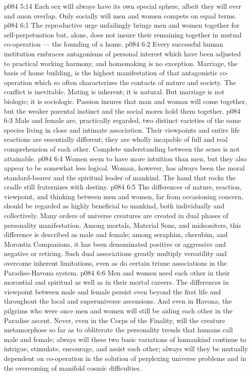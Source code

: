 \vs p084 5:14 Each sex will always have its own special sphere, albeit they will ever and anon overlap. Only socially will men and women compete on equal terms.
\vs p084 6:1 The reproductive urge unfailingly brings men and women together for self\hyp{}perpetuation but, alone, does not insure their remaining together in mutual co\hyp{}operation --- the founding of a home.
\vs p084 6:2 Every successful human institution embraces antagonisms of personal interest which have been adjusted to practical working harmony, and homemaking is no exception. Marriage, the basis of home building, is the highest manifestation of that antagonistic co\hyp{}operation which so often characterizes the contacts of nature and society. The conflict is inevitable. Mating is inherent; it is natural. But marriage is not biologic; it is sociologic. Passion insures that man and woman will come together, but the weaker parental instinct and the social mores hold them together.
\vs p084 6:3 \pc Male and female are, practically regarded, two distinct varieties of the same species living in close and intimate association. Their viewpoints and entire life reactions are essentially different; they are wholly incapable of full and real comprehension of each other. Complete understanding between the sexes is not attainable.
\vs p084 6:4 Women seem to have more intuition than men, but they also appear to be somewhat less logical. Woman, however, has always been the moral standard\hyp{}bearer and the spiritual leader of mankind. The hand that rocks the cradle still fraternizes with destiny.
\vs p084 6:5 \pc The differences of nature, reaction, viewpoint, and thinking between men and women, far from occasioning concern, should be regarded as highly beneficial to mankind, both individually and collectively. Many orders of universe creatures are created in dual phases of personality manifestation. Among mortals, Material Sons, and midsoniters, this difference is described as male and female; among seraphim, cherubim, and Morontia Companions, it has been denominated positive or aggressive and negative or retiring. Such dual associations greatly multiply versatility and overcome inherent limitations, even as do certain triune associations in the Paradise\hyp{}Havona system.
\vs p084 6:6 Men and women need each other in their morontial and spiritual as well as in their mortal careers. The differences in viewpoint between male and female persist even beyond the first life and throughout the local and superuniverse ascensions. And even in Havona, the pilgrims who were once men and women will still be aiding each other in the Paradise ascent. Never, even in the Corps of the Finality, will the creature metamorphose so far as to obliterate the personality trends that humans call male and female; always will these two basic variations of humankind continue to intrigue, stimulate, encourage, and assist each other; always will they be mutually dependent on co\hyp{}operation in the solution of perplexing universe problems and in the overcoming of manifold cosmic difficulties.
